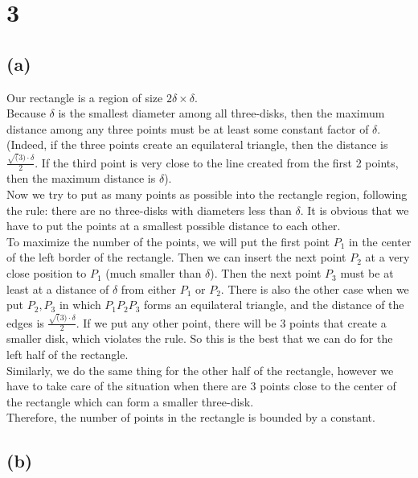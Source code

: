 
\section*{3}
\subsection*{(a)}
Our rectangle is a region of size $2 \delta \times \delta$. \\

Because $\delta$ is the smallest diameter among all three-disks, then the maximum distance among any three points must be at least some constant factor of $\delta$. (Indeed, if the three points create an equilateral triangle, then the distance is 
$\frac{\sqrt(3) \cdot \delta} {2}$. If the third point is very close to the line created from the first 2 points, then the maximum distance is $\delta$).\\

Now we try to put as many points as possible into the rectangle region, following the rule: there are no three-disks with diameters less than $\delta$. It is obvious that we have to put the points at a smallest possible distance to each other. \\

To maximize the number of the points, we will put the first point $P_1$ in the center of the left border of the rectangle. Then we can insert the next point $P_2$ at a very close position to $P_1$ (much smaller than $\delta$). Then the next point $P_3$ must be at least at a distance of $\delta$ from either $P_1$ or $P_2$. There is also the other case when we put $P_2, P_3$ in which $P_1P_2P_3$ forms an equilateral triangle, and the distance of the edges is $\frac{\sqrt(3) \cdot \delta} {2}$. If we put any other point, there will be 3 points that create a smaller disk, which violates the rule. So this is the best that we can do for the left half of the rectangle.\\

Similarly, we do the same thing for the other half of the rectangle, however we have to take care of the situation when there are 3 points close to the center of the rectangle which can form a smaller three-disk. \\

Therefore, the number of points in the rectangle is bounded by a constant.

\subsection*{(b)}


